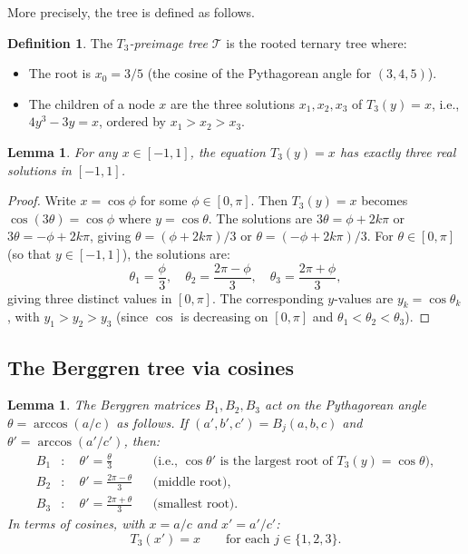 \documentclass[12pt]{amsart}
\newtheorem{lemma}[theorem]{Lemma}
\theoremstyle{definition}
\newtheorem{definition}[theorem]{Definition}
\theoremstyle{remark}
\begin{document}
More precisely, the tree is defined as follows.

\begin{definition}\label{def:preimage-tree}
The \emph{$T_3$-preimage tree} $\mathcal{T}$ is the rooted ternary tree
where:
\begin{itemize}
  \item The root is $x_0 = 3/5$ (the cosine of the Pythagorean angle for
        $(3,4,5)$).
  \item The children of a node $x$ are the three solutions
        $x_1, x_2, x_3$ of $T_3(y) = x$, i.e., $4y^3 - 3y = x$,
        ordered by $x_1 > x_2 > x_3$.
\end{itemize}
\end{definition}

\begin{lemma}\label{lem:three-real-roots}
For any $x\in[-1,1]$, the equation $T_3(y)=x$ has exactly three real
solutions in $[-1,1]$.
\end{lemma}

\begin{proof}
Write $x = \cos\phi$ for some $\phi\in[0,\pi]$.  Then $T_3(y)=x$
becomes $\cos(3\theta)=\cos\phi$ where $y=\cos\theta$.  The solutions
are $3\theta = \phi + 2k\pi$ or $3\theta = -\phi + 2k\pi$, giving
$\theta = (\phi+2k\pi)/3$ or $\theta = (-\phi+2k\pi)/3$.
For $\theta\in[0,\pi]$ (so that $y\in[-1,1]$), the solutions are:
\[
  \theta_1 = \frac{\phi}{3}, \quad
  \theta_2 = \frac{2\pi - \phi}{3}, \quad
  \theta_3 = \frac{2\pi + \phi}{3},
\]
giving three distinct values in $[0,\pi]$.  The corresponding $y$-values
are $y_k = \cos\theta_k$, with $y_1 > y_2 > y_3$ (since $\cos$ is
decreasing on $[0,\pi]$ and $\theta_1 < \theta_2 < \theta_3$).
\end{proof}

\subsection{The Berggren tree via cosines}

\begin{lemma}\label{lem:berggren-cosine}
The Berggren matrices $B_1, B_2, B_3$ act on the Pythagorean angle
$\theta = \arccos(a/c)$ as follows.  If $(a',b',c') = B_j(a,b,c)$
and $\theta' = \arccos(a'/c')$, then:
\begin{align*}
  B_1&: \quad \theta' = \frac{\theta}{3}
        &&\text{(i.e., } \cos\theta' \text{ is the largest root of }
        T_3(y)=\cos\theta\text{)}, \\[2pt]
  B_2&: \quad \theta' = \frac{2\pi - \theta}{3}
        &&\text{(middle root)}, \\[2pt]
  B_3&: \quad \theta' = \frac{2\pi + \theta}{3}
        &&\text{(smallest root)}.
\end{align*}
In terms of cosines, with $x = a/c$ and $x' = a'/c'$:
\begin{equation}\label{eq:berggren-T3}
  T_3(x') = x \qquad \text{for each } j\in\{1,2,3\}.
\end{equation}
\end{lemma}
\end{document}
